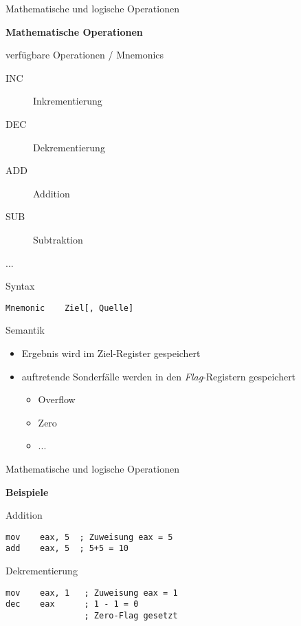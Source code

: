 \begin{frame}[fragile]{Mathematische und logische Operationen}

\begin{center}
\textbf{Mathematische Operationen}
\end{center}

verfügbare Operationen / Mnemonics
\begin{description}
    \item [INC] Inkrementierung
    \item [DEC] Dekrementierung
    \item [ADD] Addition
    \item [SUB] Subtraktion
    \item [...]
\end{description}

\makebox{}

Syntax
\begin{lstlisting}
Mnemonic    Ziel[, Quelle]
\end{lstlisting}

\makebox{}

Semantik
\begin{itemize}
    \item Ergebnis wird im Ziel-Register gespeichert

    \item auftretende Sonderfälle werden in den \textit{Flag}-Registern gespeichert
    \begin{itemize}
        \item Overflow
        \item Zero
        \item ...
    \end{itemize}
\end{itemize}
\end{frame}

\begin{frame}[fragile]{Mathematische und logische Operationen}

\begin{center}
\textbf{Beispiele}
\end{center}

Addition
\begin{lstlisting}
mov    eax, 5  ; Zuweisung eax = 5
add    eax, 5  ; 5+5 = 10
\end{lstlisting}

\makebox{}

Dekrementierung
\begin{lstlisting}
mov    eax, 1   ; Zuweisung eax = 1
dec    eax      ; 1 - 1 = 0
                ; Zero-Flag gesetzt
\end{lstlisting}

\end{frame}

